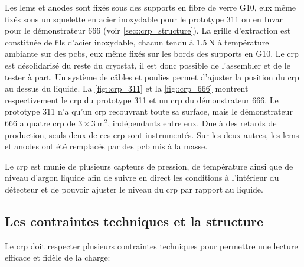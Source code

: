             Les \glspl{lem} et anodes sont fixés sous des supports en fibre de verre G10, eux même fixés sous un squelette en acier inoxydable pour le prototype 311 ou en Invar pour le démonstrateur 666 (voir \autoref{sec::crp_structure}). La grille d'extraction est constituée de fils d'acier inoxydable, chacun tendu à $\SI{1.5}{\newton}$ à température ambiante sur des \glspl{pcb}, eux même fixés sur les bords des supports en G10. Le \gls{crp} est désolidarisé du reste du cryostat, il est donc possible de l'assembler et de le tester à part. Un système de câbles et poulies permet d'ajuster la position du \gls{crp} au dessus du liquide. La \autoref{fig::crp_311} et la \autoref{fig::crp_666} montrent respectivement le \gls{crp} du prototype 311 et un \gls{crp} du démonstrateur 666. Le prototype 311 n'a qu'un \gls{crp} recouvrant toute sa surface, mais le démonstrateur 666 a quatre \gls{crp} de $3\times\SI{3}{\meter\squared}$, indépendants entre eux. Due à des retards de production, seuls deux de ces \gls{crp} sont instrumentés. Sur les deux autres, les \glspl{lem} et anodes ont été remplacés par des \gls{pcb} mis à la masse.
            
            Le \gls{crp} est munie de plusieurs capteurs de pression, de température ainsi que de niveau d'argon liquide afin de suivre en direct les conditions à l'intérieur du détecteur et de pouvoir ajuster le niveau du \gls{crp} par rapport au liquide.
        
        \subsection{Les contraintes techniques et la structure}\label{sec::crp_structure}
            
            Le \gls{crp} doit respecter plusieurs contraintes techniques \cite{CRPdesign} pour permettre une lecture efficace et fidèle de la charge:
            
